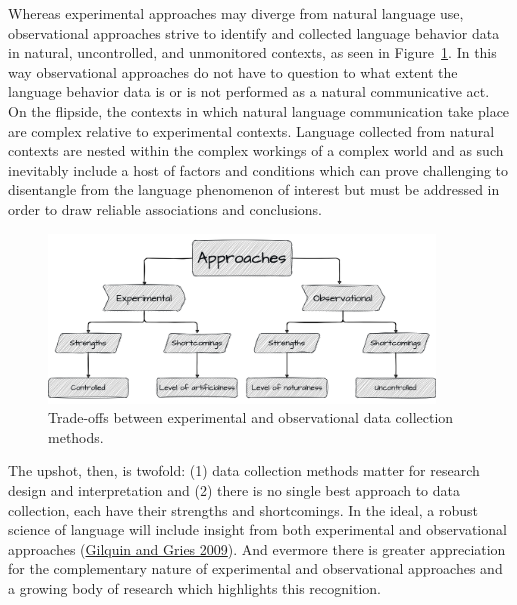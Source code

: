 \documentclass[
  letterpaper,
  DIV=11,
  numbers=noendperiod]{scrreport}
\theoremstyle{definition}
\theoremstyle{remark}
\begin{document}
Whereas experimental approaches may diverge from natural language use,
observational approaches strive to identify and collected language
behavior data in natural, uncontrolled, and unmonitored contexts, as
seen in Figure~\ref{fig-data-collection-methods}. In this way
observational approaches do not have to question to what extent the
language behavior data is or is not performed as a natural communicative
act. On the flipside, the contexts in which natural language
communication take place are complex relative to experimental contexts.
Language collected from natural contexts are nested within the complex
workings of a complex world and as such inevitably include a host of
factors and conditions which can prove challenging to disentangle from
the language phenomenon of interest but must be addressed in order to
draw reliable associations and conclusions.

\begin{figure}[H]

{\centering \includegraphics[width=4.04in,height=\textheight]{figures/ta-data-collection-methods.drawio.png}

}

\caption{\label{fig-data-collection-methods}Trade-offs between
experimental and observational data collection methods.}

\end{figure}

The upshot, then, is twofold: (1) data collection methods matter for
research design and interpretation and (2) there is no single best
approach to data collection, each have their strengths and shortcomings.
In the ideal, a robust science of language will include insight from
both experimental and observational approaches
(\protect\hyperlink{ref-Gilquin2009}{Gilquin and Gries 2009}). And
evermore there is greater appreciation for the complementary nature of
experimental and observational approaches and a growing body of research
which highlights this recognition.
\end{document}
